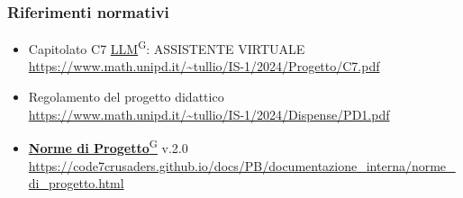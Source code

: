 \subsubsection{Riferimenti normativi}
\begin{itemize}
    \item Capitolato C7 \href{https://code7crusaders.github.io/docs/PB/documentazione_interna/glossario.html#llm-large-language-model}{LLM}\textsuperscript{G}: ASSISTENTE VIRTUALE \\ \url{https://www.math.unipd.it/~tullio/IS-1/2024/Progetto/C7.pdf}
    \item Regolamento del progetto didattico \\ \url{https://www.math.unipd.it/~tullio/IS-1/2024/Dispense/PD1.pdf}
    \item \href{https://code7crusaders.github.io/docs/PB/documentazione_interna/glossario.html#norme-di-progetto}{\textbf{Norme di Progetto}\textsuperscript{G}} v.2.0 \\ \url{https://code7crusaders.github.io/docs/PB/documentazione_interna/norme_di_progetto.html}
\end{itemize}

